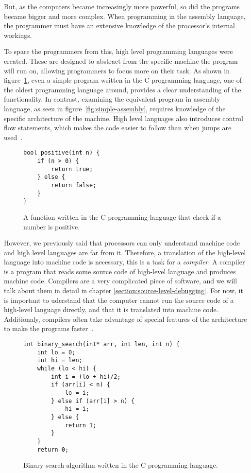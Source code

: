 But, as the computers became increasingly more powerful, so did the programs
became bigger and more complex. When programming in the assembly language,
the programmer must have an extensive knowledge of the processor's internal
workings.

To spare the programmers from this, high level programming languages were
created. These are designed to abstract from the specific machine the program
will run on, allowing programmers to focus more on their task. As shown in
figure~\ref{fig:c-positive}, even a simple program written in the C programming
language, one of the oldest programming language around, provides a clear
understanding of the functionality. In contrast, examining the equivalent
program in assembly language, as seen in figure~\ref{fig:simple-assembly},
requires knowledge of the specific architecture of the machine. High level
languages also introduces control flow statements, which makes the code easier
to follow than when jumps are used~\cite{gotobad}.

\begin{figure}
\begin{verbatim}
bool positive(int n) {
    if (n > 0) {
        return true;
    } else {
        return false;
    }
}
\end{verbatim}
\caption{A function written in the C programming language that check if a
    number is positive.}
\label{fig:c-positive}
\end{figure}

However, we previously said that processors can only understand machine code
and high level languages are far from it. Therefore, a translation of the
high-level language into machine code is necessary, this is a task for a
\textit{compiler}. A compiler is a program that reads some source code of
high-level language and produces machine code. Compilers are a very complicated
piece of software, and we will talk about them in detail in chapter
\ref{section:source-level-debugging}. For now, it is important to uderstand
that the computer cannot run the source code of a high-level language directly,
and that it is translated into machine code. Additionaly, compilers often take
advantage of special features of the architecture to make the programs
faster~\cite{dragon-book}.

\begin{figure}[H]
    \begin{verbatim}
int binary_search(int* arr, int len, int n) {
    int lo = 0;
    int hi = len;
    while (lo < hi) {
        int i = (lo + hi)/2;
        if (arr[i] < n) {
            lo = i;
        } else if (arr[i] > n) {
            hi = i;
        } else {
            return 1;
        }
    }
    return 0;
    \end{verbatim}
    \caption{Binary search algorithm written in the C programming language.}
    \label{fig:binary-search}
\end{figure}

